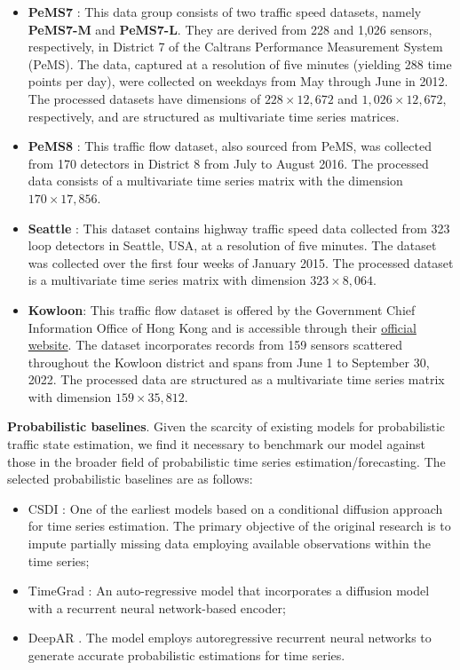 \documentclass[a4paper,fleqn,12pt]{cas-sc}
\begin{document}
\begin{itemize}
\item \textbf{PeMS7} \citep{song2020spatial}: This data group consists of two traffic speed datasets, namely \textbf{PeMS7-M} and \textbf{PeMS7-L}. They are derived from 228 and 1,026 sensors, respectively, in District 7 of the Caltrans Performance Measurement System (PeMS). The data, captured at a resolution of five minutes (yielding 288 time points per day), were collected on weekdays from May through June in 2012. The processed datasets have dimensions of $228\times 12,672$ and $1,026\times 12,672$, respectively, and are structured as multivariate time series matrices.
\item \textbf{PeMS8} \citep{guo2019attention}: This traffic flow dataset, also sourced from PeMS, was collected from 170 detectors in District 8 from July to August 2016. The processed data consists of a multivariate time series matrix with the dimension $170\times 17,856$.
\item \textbf{Seattle} \citep{cui2019traffic}: This dataset contains highway traffic speed data collected from 323 loop detectors in Seattle, USA, at a resolution of five minutes. The dataset was collected over the first four weeks of January 2015. The processed dataset is a multivariate time series matrix with dimension $323\times 8,064$.
\item \textbf{Kowloon}: This traffic flow dataset is offered by the Government Chief Information Office of Hong Kong and is accessible through their \href{https://data.gov.hk/en-data/dataset/hk-td-sm_4-traffic-data-strategic-major-roads}{official website}. The dataset incorporates records from 159 sensors scattered throughout the Kowloon district and spans from June 1 to September 30, 2022. The processed data are structured as a multivariate time series matrix with dimension $159\times 35,812$.
\end{itemize}

\noindent\textbf{Probabilistic baselines}. Given the scarcity of existing models for probabilistic traffic state estimation, we find it necessary to benchmark our model against those in the broader field of probabilistic time series estimation/forecasting. The selected probabilistic baselines are as follows:
\begin{itemize}
  \item CSDI \citep{tashiro2021csdi}: One of the earliest models based on a conditional diffusion approach for time series estimation. The primary objective of the original research is to impute partially missing data employing available observations within the time series;
  \item TimeGrad \citep{rasul2021autoregressive}: An auto-regressive model that incorporates a diffusion model with a recurrent neural network-based encoder;
  \item DeepAR \citep{salinas2020deepar}. The model employs autoregressive recurrent neural networks to generate accurate probabilistic estimations for time series.
\end{itemize}
\end{document}

